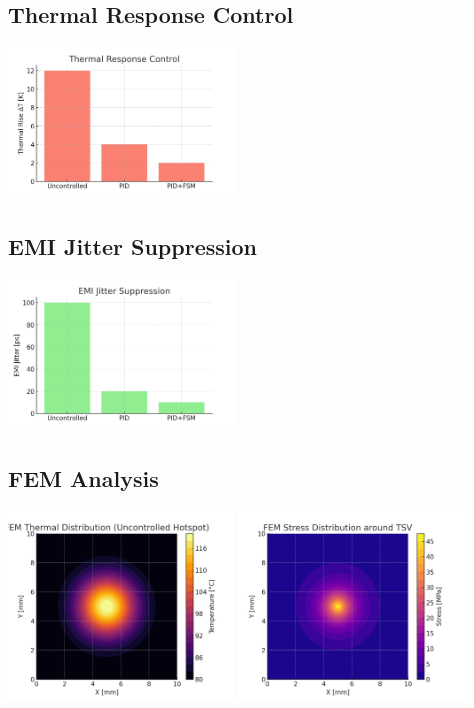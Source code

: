 \documentclass[conference]{IEEEtran}
\begin{document}
\subsection{Thermal Response Control}
\includegraphics[width=0.45\textwidth]{sim_thermal_response.png}

\subsection{EMI Jitter Suppression}
\includegraphics[width=0.45\textwidth]{sim_emi_jitter.png}

\subsection{FEM Analysis}
\includegraphics[width=0.45\textwidth]{fem_thermal_map.png}
\includegraphics[width=0.45\textwidth]{fem_stress_map.png}
\end{document}
